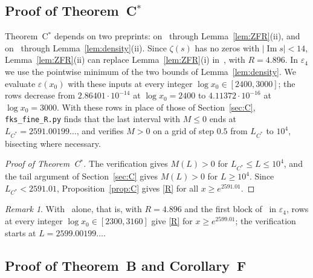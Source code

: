 \documentclass{amsart}
\theoremstyle{definition}
\theoremstyle{remark}
\newtheorem{remark}[theorem]{Remark}
\theoremstyle{plain}
\numberwithin{equation}{section}
\newcommand{\eps}{\varepsilon}
\newcommand{\Cstar}{C$^*$}
\begin{document}
\subsection{\texorpdfstring{Proof of Theorem~\Cstar}{Proof of Theorem C*}}\label{sec:Cstar}
Theorem~\Cstar{} depends on two preprints: on~\cite{BTY26} through Lemma~\ref{lem:ZFR}(ii), and on~\cite{Bel24} through Lemma~\ref{lem:density}(ii). Since $\zeta(s)$ has no zeros with $|\operatorname{Im}s|<14$, Lemma~\ref{lem:ZFR}(ii) can replace Lemma~\ref{lem:ZFR}(i) in~\cite[Thm.~1.1]{FKS23}, with $R=4.896$. In $\eps_4$ we use the pointwise minimum of the two bounds of Lemma~\ref{lem:density}. We evaluate $\eps(x_0)$ with these inputs at every integer $\log x_0\in[2400,3000]$; the rows decrease from $2.86401\cdot10^{-14}$ at $\log x_0=2400$ to $4.11372\cdot10^{-16}$ at $\log x_0=3000$. With these rows in place of those of Section~\ref{sec:C}, \texttt{fks\_fine\_R.py} finds that the last interval with $M\le0$ ends at $L_{C^*}=2591.00199\ldots$, and verifies $M>0$ on a grid of step $0.5$ from $L_{C^*}$ to $10^4$, bisecting where necessary.

\begin{proof}[Proof of Theorem~\Cstar]
The verification gives $M(L)>0$ for $L_{C^*}\le L\le10^4$, and the tail argument of Section~\ref{sec:C} gives $M(L)>0$ for $L\ge10^4$. Since $L_{C^*}<2591.01$, Proposition~\ref{prop:C} gives \eqref{R} for all $x\ge e^{2591.01}$.
\end{proof}

\begin{remark}\label{rem:Cstarvar}
With~\cite{BTY26} alone, that is, with $R=4.896$ and the first block of~\cite[Table~7]{FKS23} in $\eps_4$, rows at every integer $\log x_0\in[2300,3160]$ give \eqref{R} for $x\ge e^{2599.01}$; the verification starts at $L=2599.00199\ldots$.
\end{remark}

\subsection{Proof of Theorem~B and Corollary~F}\label{sec:B}
\end{document}

